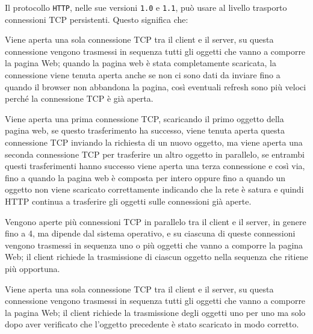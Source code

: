 \question
Il protocollo \texttt{HTTP}, nelle sue versioni \texttt{1.0} e \texttt{1.1}, può usare al livello trasporto connessioni TCP persistenti. %
Questo significa che:

\begin{checkboxes}
	\choice Viene aperta una sola connessione TCP tra il client e il server, su questa connessione vengono trasmessi in sequenza tutti gli oggetti che vanno a comporre la pagina Web; %
	quando la pagina web è stata completamente scaricata, la connessione viene tenuta aperta anche se non ci sono dati da inviare fino a quando il browser non abbandona la pagina, così eventuali refresh sono più veloci perché la connessione TCP è già aperta.

	\choice Viene aperta una prima connessione TCP, scaricando il primo oggetto della pagina web, se questo trasferimento ha successo, viene tenuta aperta questa connessione TCP inviando la richiesta di un nuovo oggetto, ma viene aperta una seconda connessione TCP per trasferire un altro oggetto in parallelo, se entrambi questi trasferimenti hanno successo viene aperta una terza connessione e così via, fino a quando la pagina web è composta per intero oppure fino a quando un oggetto non viene scaricato correttamente indicando che la rete è satura e quindi HTTP continua a trasferire gli oggetti sulle connessioni già aperte.

	\CorrectChoice Vengono aperte più connessioni TCP in parallelo tra il client e il server, in genere fino a 4, ma dipende dal sistema operativo, e su ciascuna di queste connessioni vengono trasmessi in sequenza uno o più oggetti che vanno a comporre la pagina Web; %
	il client richiede la trasmissione di ciascun oggetto nella sequenza che ritiene più opportuna.

	\choice Viene aperta una sola connessione TCP tra il client e il server, su questa connessione vengono trasmessi in sequenza tutti gli oggetti che vanno a comporre la pagina Web; il client richiede la trasmissione degli oggetti uno per uno ma solo dopo aver verificato che l'oggetto precedente è stato scaricato in modo corretto.
\end{checkboxes}
